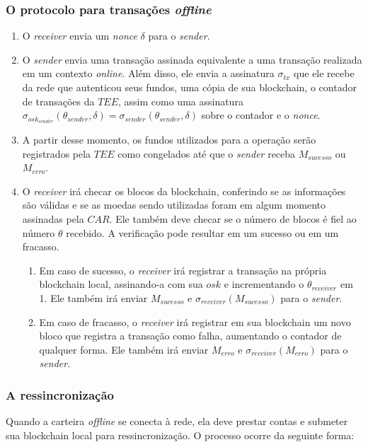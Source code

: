 \documentclass[
  12pt,
  a4paper,
  oneside,
  article,
]{abntex2}
\begin{document}
\subsubsection{O protocolo para transações \textit{offline}}

\begin{enumerate}
	\item O \textit{receiver} envia um \textit{nonce} $\delta$ para o \textit{sender}.
	\item O \textit{sender} envia uma transação assinada equivalente a uma transação realizada em um contexto \textit{online}. Além disso, ele envia a assinatura $\sigma_{tx}$ que ele recebe da rede que autenticou seus fundos, uma cópia de sua blockchain, o contador de transações da $TEE$, assim como uma assinatura $\sigma_{osk_{sender}}(\theta_{sender}, \delta) = \sigma_{sender} (\theta_{sender}, \delta)$ sobre o contador e o \textit{nonce}.
	\item A partir desse momento, os fundos utilizados para a operação serão registrados pela $TEE$ como congelados até que o \textit{sender} receba $M_{sucesso}$ ou $M_{erro}$.
	\item O \textit{receiver} irá checar os blocos da blockchain, conferindo se as informações são válidas e se as moedas sendo utilizadas foram em algum momento assinadas pela $CAR$. Ele também deve checar se o número de blocos é fiel ao número $\theta$ recebido. A verificação pode resultar em um sucesso ou em um fracasso.
	      \begin{enumerate}
		      \item Em caso de sucesso, o \textit{receiver} irá registrar a transação na própria blockchain local, assinando-a com sua $osk$ e incrementando o $\theta_{receiver}$ em 1. Ele também irá enviar $M_{sucesso}$ e $\sigma_{receiver}(M_{sucesso})$ para o \textit{sender}.
		      \item Em caso de fracasso, o \textit{receiver} irá registrar em sua blockchain um novo bloco que registra a transação como falha, aumentando o contador de qualquer forma. Ele também irá enviar $M_{erro}$ e $\sigma_{receiver}(M_{erro})$ para o \textit{sender}.
	      \end{enumerate}
\end{enumerate}

\subsubsection{A ressincronização}

Quando a carteira \textit{offline} se conecta à rede, ela deve prestar contas e submeter sua blockchain local para ressincronização. O processo ocorre da seguinte forma:
\end{document}

